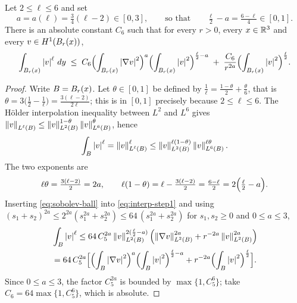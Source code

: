 \documentclass[11pt,reqno]{amsart}
\begin{document}
\begin{lemma}\label{lem:interpolation-ball}
Let $2\le \ell\le6$ and set
\begin{equation}\label{eq:a-exponent}
  a=a(\ell)=\tfrac34(\ell-2)\in[0,3],
  \qquad\text{so that}\qquad
  \tfrac \ell2-a=\tfrac{6-\ell}{4}\in[0,1].
\end{equation}
There is an absolute constant $C_{6}$ such that for every $r>0$, every
$x\in\mathbb{R}^{3}$ and every $v\in H^{1}(B_{r}(x))$,
\begin{equation}\label{eq:interpolation-ball}
  \int_{B_{r}(x)}\left\lvert v \right\rvert^{\ell}\,dy
  \;\le\;C_{6}\Bigl(\int_{B_{r}(x)}\left\lvert \nabla v \right\rvert^{2}\Bigr)^{a}
      \Bigl(\int_{B_{r}(x)}\left\lvert v \right\rvert^{2}\Bigr)^{\frac \ell2-a}
     \;+\;\frac{C_{6}}{r^{2a}}\Bigl(\int_{B_{r}(x)}\left\lvert v \right\rvert^{2}\Bigr)^{\frac \ell2}.
\end{equation}
\end{lemma}

\begin{proof}
Write $B=B_{r}(x)$. Let $\theta\in[0,1]$ be defined by
$\tfrac1\ell=\tfrac{1-\theta}{2}+\tfrac{\theta}{6}$, that is
$\theta=3\bigl(\tfrac12-\tfrac1\ell\bigr)=\tfrac{3(\ell-2)}{2\ell}$; this is in $[0,1]$
precisely because $2\le \ell\le6$. The H\"older interpolation inequality between
$L^{2}$ and $L^{6}$ gives
$\left\lVert v \right\rVert_{L^{\ell}(B)}\le\left\lVert v \right\rVert_{L^{2}(B)}^{1-\theta}\left\lVert v \right\rVert_{L^{6}(B)}^{\theta}$,
hence
\begin{equation}\label{eq:interp-step1}
  \int_{B}\left\lvert v \right\rvert^{\ell}
  =\left\lVert v \right\rVert_{L^{\ell}(B)}^{\ell}
  \le\left\lVert v \right\rVert_{L^{2}(B)}^{\ell(1-\theta)}\left\lVert v \right\rVert_{L^{6}(B)}^{\ell\theta} .
\end{equation}
The two exponents are
\[
  \ell\theta=\tfrac{3(\ell-2)}{2}=2a,
  \qquad
  \ell(1-\theta)=\ell-\tfrac{3(\ell-2)}{2}=\tfrac{6-\ell}{2}=2\Bigl(\tfrac \ell2-a\Bigr).
\]
Inserting \eqref{eq:sobolev-ball} into \eqref{eq:interp-step1} and using
$(s_{1}+s_{2})^{2a}\le2^{2a}(s_{1}^{2a}+s_{2}^{2a})\le 64\,(s_{1}^{2a}+s_{2}^{2a})$
for $s_{1},s_{2}\ge0$ and $0\le a\le3$,
\[\begin{aligned}
  &\int_{B}\left\lvert v \right\rvert^{\ell}
  \le 64\,C_{5}^{2a}\left\lVert v \right\rVert_{L^{2}(B)}^{2(\frac \ell2-a)}
     \Bigl(\left\lVert \nabla v \right\rVert_{L^{2}(B)}^{2a}+r^{-2a}\left\lVert v \right\rVert_{L^{2}(B)}^{2a}\Bigr)
  \\ &=64\,C_{5}^{2a}\Bigl[
     \Bigl(\int_{B}\left\lvert \nabla v \right\rvert^{2}\Bigr)^{a}\Bigl(\int_{B}\left\lvert v \right\rvert^{2}\Bigr)^{\frac \ell2-a}
     +r^{-2a}\Bigl(\int_{B}\left\lvert v \right\rvert^{2}\Bigr)^{\frac \ell2}\Bigr].
\end{aligned}\]
Since $0\le a\le3$, the factor $C_{5}^{2a}$ is bounded by $\max\{1,C_{5}^{6}\}$;
take $C_{6}=64\max\{1,C_{5}^{6}\}$, which is absolute.
\end{proof}
\end{document}
